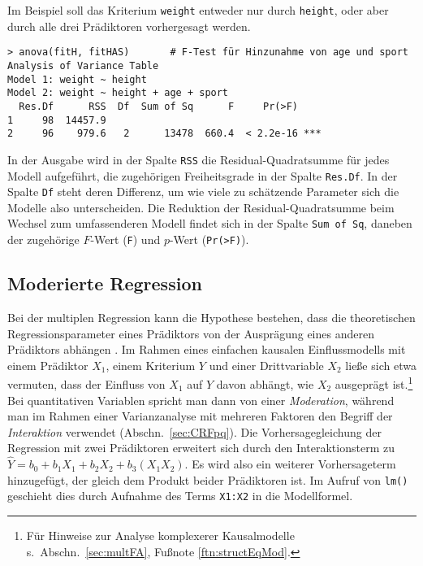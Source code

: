 Im Beispiel soll das Kriterium \lstinline!weight! entweder nur durch \lstinline!height!, oder aber durch alle drei Prädiktoren vorhergesagt werden.
\begin{lstlisting}
> anova(fitH, fitHAS)       # F-Test für Hinzunahme von age und sport
Analysis of Variance Table
Model 1: weight ~ height
Model 2: weight ~ height + age + sport
  Res.Df      RSS  Df  Sum of Sq      F     Pr(>F)
1     98  14457.9
2     96    979.6   2      13478  660.4  < 2.2e-16 ***
\end{lstlisting}

In der Ausgabe wird in der Spalte \lstinline!RSS! die Residual-Quadratsumme für jedes Modell aufgeführt, die zugehörigen Freiheitsgrade in der Spalte \lstinline!Res.Df!. In der Spalte \lstinline!Df! steht deren Differenz, um wie viele zu schätzende Parameter sich die Modelle also unterscheiden. Die Reduktion der Residual-Quadratsumme beim Wechsel zum umfassenderen Modell findet sich in der Spalte \lstinline!Sum of Sq!, daneben der zugehörige $F$-Wert (\lstinline!F!) und $p$-Wert (\lstinline!Pr(>F)!).

\subsection{Moderierte Regression}
\label{sec:regrMod}

Bei der multiplen Regression kann die Hypothese bestehen, dass die theoretischen Regressionsparameter eines Prädiktors von der Ausprägung eines anderen Prädiktors abhängen \cite{Aiken1991}. Im Rahmen eines einfachen kausalen Einflussmodells mit einem Prädiktor $X_{1}$, einem Kriterium $Y$ und einer Drittvariable $X_{2}$ ließe sich etwa vermuten, dass der Einfluss von $X_{1}$ auf $Y$ davon abhängt, wie $X_{2}$ ausgeprägt ist.\footnote{Für Hinweise zur Analyse komplexerer Kausalmodelle s.\ Abschn.\ \ref{sec:multFA}, Fußnote \ref{ftn:structEqMod}.} Bei quantitativen Variablen spricht man dann von einer \emph{Moderation}, während man im Rahmen einer Varianzanalyse mit mehreren Faktoren den Begriff der \emph{Interaktion} verwendet (Abschn.\ \ref{sec:CRFpq}). Die Vorhersagegleichung der Regression mit zwei Prädiktoren erweitert sich durch den Interaktionsterm zu $\hat{Y} = b_{0} + b_{1} X_{1} + b_{2} X_{2} + b_{3} (X_{1} X_{2})$. Es wird also ein weiterer Vorhersageterm hinzugefügt, der gleich dem Produkt beider Prädiktoren ist. Im Aufruf von \lstinline!lm()! geschieht dies durch Aufnahme des Terms \lstinline!X1:X2! in die Modellformel.

